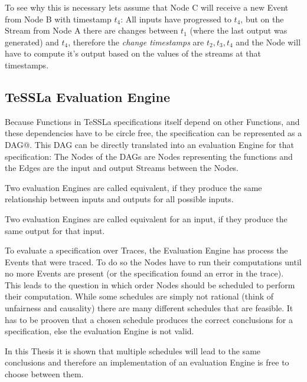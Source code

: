 To see why this is necessary lets assume that Node C will receive a new Event from Node B with timestamp \(t_4\):
All inputs have progressed to \(t_4\), but on the Stream from Node A there are changes between \(t_1\) (where the last output was generated) and \(t_4\),
therefore the \emph{change timestamps} are \(t_2, t_3, t_4\) and the Node will have to compute it's output based on the values of the streams at that timestamps.

\subsection{TeSSLa Evaluation Engine}
\label{sec:concepts:def:model}

Because Functions in TeSSLa specifications itself depend on other Functions, and these dependencies have to be circle free,
the specification can be represented as a DAG@.
This DAG can be directly translated into an evaluation Engine for that specification: The Nodes of the DAGs are Nodes representing the functions and the Edges are the input and output Streams between the Nodes.

\begin{definition}[name=Equivalence of evaluation Engines]\label{def:equivalence_eval_engine}
  Two evaluation Engines are called equivalent, if they produce the same relationship between inputs and outputs for all possible inputs.
\end{definition}

\begin{definition}[name=Equivalence of evaluation Engines for an input]\label{def:equivalence_eval_engine_specific}
  Two evaluation Engines are called equivalent for an input, if they produce the same output for that input.
\end{definition}

To evaluate a specification over Traces, the Evaluation Engine has process the Events that were traced.
To do so the Nodes have to run their computations until no more Events are present (or the specification found an error in the trace).
This leads to the question in which order Nodes should be scheduled to perform their computation.
While some schedules are simply not rational (think of unfairness and causality) there are many different schedules that are feasible.
It has to be prooven that a chosen schedule produces the correct conclusions for a specification, else the evaluation Engine is not valid.

In this Thesis it is shown that multiple schedules will lead to the same conclusions and therefore an implementation of an evaluation Engine is free to choose between them.

